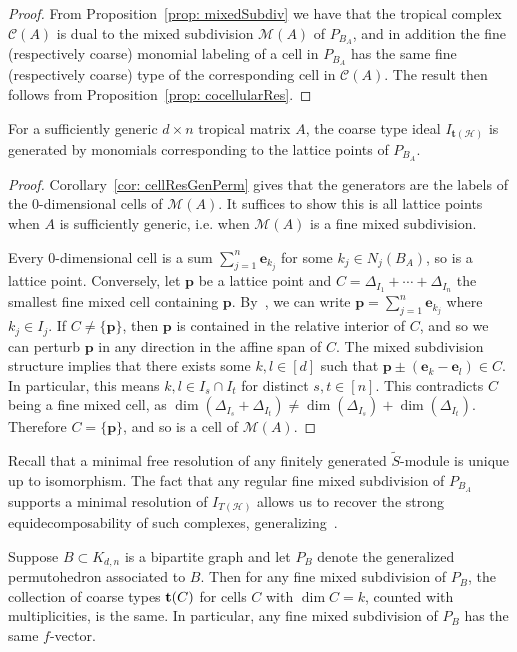 \documentclass[11pt]{article}
\theoremstyle{definition}
\numberwithin{equation}{section}
\newcommand{\cC}{\mathcal{C}}
\newcommand{\cH}{\mathcal{H}}
\newcommand{\bft}{\mathbf{t}}
\newcommand{\ee}{\mathbf e}
\newcommand{\pp}{\mathbf p}
\begin{document}
\begin{proof}
From Proposition~\ref{prop: mixedSubdiv} we have that the tropical complex $\cC(A)$ is dual to the mixed subdivision ${\mathcal M}(A)$ of $P_{B_A}$, and in addition the fine (respectively coarse) monomial labeling of a cell in $P_{B_A}$ has the same fine (respectively coarse) type of the corresponding cell in $\cC(A)$.  The result then follows from Proposition~\ref{prop: cocellularRes}.
\end{proof}

\begin{cor}\label{cor: coarsemonomials}
For a sufficiently generic $d \times n$ tropical matrix $A$, the coarse type ideal $I_{\bft(\cH)}$ is generated by monomials corresponding to the lattice points of $P_{B_A}$.
\end{cor}
\begin{proof}
Corollary~\ref{cor: cellResGenPerm} gives that the generators are the labels of the 0-dimensional cells of ${\mathcal M}(A)$.
It suffices to show this is all lattice points when $A$ is sufficiently generic, i.e. when $\mathcal{M}(A)$ is a fine mixed subdivision.

Every 0-dimensional cell is a sum $\sum_{j=1}^n \ee_{k_j}$ for some $k_j \in N_j(B_A)$, so is a lattice point.
Conversely, let $\pp$ be a lattice point and $C = \Delta_{I_1} + \cdots + \Delta_{I_n}$ the smallest fine mixed cell containing $\pp$.
By~\cite[Lemma 14.12]{postnikov2009permutohedra}, we can write $\pp = \sum_{j=1}^n \ee_{k_j}$ where $k_j \in I_j$.
If $C \neq \{\pp\}$, then $\pp$ is contained in the relative interior of $C$, and so we can perturb $\pp$ in any direction in the affine span of $C$.
The mixed subdivision structure implies that there exists some $k, l \in [d]$ such that $\pp \pm (\ee_k - \ee_l) \in C$.
In particular, this means $k, l \in I_s \cap I_t$ for distinct $s, t \in [n]$.
This contradicts $C$ being a fine mixed cell, as $\dim(\Delta_{I_s} + \Delta_{I_t}) \neq \dim(\Delta_{I_s}) + \dim(\Delta_{I_t})$.
Therefore $C = \{\pp\}$, and so is a cell of $\mathcal{M}(A)$.
\end{proof}

Recall that a minimal free resolution of any finitely generated $\widetilde{S}$-module is unique up to isomorphism. The fact that any regular fine mixed subdivision of $P_{B_A}$ supports a minimal resolution of $I_{T(\cH)}$ allows us to recover the strong equidecomposability of such complexes, generalizing~\cite[Corollary 5]{dochtermann2012tropical}.

\begin{cor}
Suppose $B \subset K_{d,n}$ is a bipartite graph and let $P_{B}$ denote the generalized permutohedron associated to $B$.  Then for any fine mixed subdivision of $P_{B}$, the collection of coarse types ${\bf t}(C)$ for cells $C$ with $\dim C = k$, counted with multiplicities, is the same.
In particular, any fine mixed subdivision of $P_{B}$ has the same $f$-vector.
\end{cor}
\end{document}
